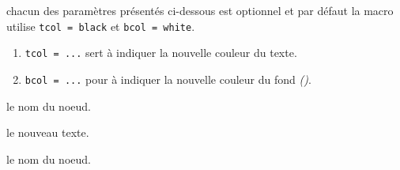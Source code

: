 \documentclass[12pt,a4paper]{article}
\begin{document}
%
%
%
%




\separation



\IDoption{} chacun des paramètres présentés ci-dessous est optionnel et par défaut la macro utilise \verb#tcol = black# et \verb#bcol = white#.

\begin{enumerate}
	\item \verb#tcol = ...# sert à indiquer la nouvelle couleur du texte.

	\item \verb#bcol = ...# pour à indiquer la nouvelle couleur du fond \emph{()}.
\end{enumerate}

 le nom du noeud.

 le nouveau texte.

%
%
%
%
%




\separation



\IDarg{} le nom du noeud.


%
%
%
%
\end{document}
